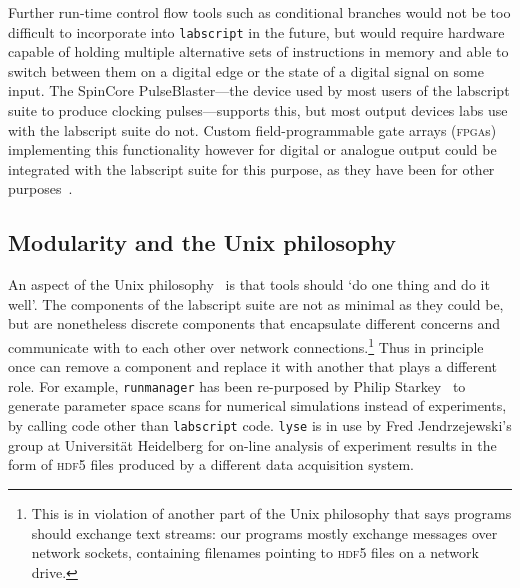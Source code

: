 Further run-time control flow tools such as conditional branches would not be too difficult to incorporate into \texttt{labscript} in the future, but would require hardware capable of holding multiple alternative sets of instructions in memory and able to switch between them on a digital edge or the state of a digital signal on some input. The SpinCore PulseBlaster---the device used by most users of the labscript suite to produce clocking pulses---supports this, but most output devices labs use with the labscript suite do not. Custom field-programmable gate arrays (\textsc{fpga}s) implementing this functionality however for digital or analogue output could be integrated with the labscript suite for this purpose, as they have been for other purposes~\cite{gill_optical_2016}.

\subsection{Modularity and the Unix philosophy}

An aspect of the Unix philosophy~\cite{gancarz_unix_1995} is that tools should `do one thing and do it well'. The components of the labscript suite are not as minimal as they could be, but are nonetheless discrete components that encapsulate different concerns and communicate with to each other over network connections.\footnote{This is in violation of another part of the Unix philosophy that says programs should exchange text streams: our programs mostly exchange messages over network sockets, containing filenames pointing to \textsc{hdf5} files on a network drive.} Thus in principle once can remove a component and replace it with another that plays a different role. For example, \texttt{runmanager} has been re-purposed by Philip Starkey~\cite{starkey_thesis_2018} to generate parameter space scans for numerical simulations instead of experiments, by calling code other than \texttt{labscript} code. \texttt{lyse} is in use by Fred Jendrzejewski's group at Universit\"at Heidelberg for on-line analysis of experiment results in the form of \textsc{hdf5} files produced by a different data acquisition system.

